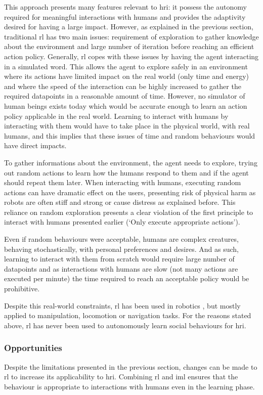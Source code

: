 	This approach presents many features relevant to \gls{hri}: it possess the autonomy required for meaningful interactions with humans and provides the adaptivity desired for having a large impact. However, as explained in the previous section, traditional \gls{rl} has two main issues: requirement of exploration to gather knowledge about the environment and large number of iteration before reaching an efficient action policy. Generally, \gls{rl} copes with these issues by having the agent interacting in a simulated word. This allows the agent to explore safely in an environment where its actions have limited impact on the real world (only time and energy) and where the speed of the interaction can be highly increased to gather the required datapoints in a reasonable amount of time. However, no simulator of human beings exists today which would be accurate enough to learn an action policy applicable in the real world. Learning to interact with humans by interacting with them would have to take place in the physical world, with real humans, and this implies that these issues of time and random behaviours would have direct impacts. 
	
	To gather informations about the environment, the agent needs to explore, trying out random actions to learn how the humans respond to them and if the agent should repeat them later. When interacting with humans, executing random actions can have dramatic effect on the users, presenting risk of physical harm as robots are often stiff and strong or cause distress as explained before. This reliance on random exploration presents a clear violation of the first principle to interact with humans presented earlier (`Only execute appropriate actions').
	
	Even if random behaviours were acceptable, humans are complex creatures, behaving stochastically, with personal preferences and desires. And as such, learning to interact with them from scratch would require large number of datapoints and as interactions with humans are slow (not many actions are executed per minute) the time required to reach an acceptable policy would be prohibitive. 
	
	Despite this real-world constraints, \gls{rl} has been used in robotics \citep{kober2013reinforcement}, but mostly applied to manipulation, locomotion or navigation tasks. For the reasons stated above, \gls{rl} has never been used to autonomously learn social behaviours for \gls{hri}. 
	
	\subsubsection{Opportunities}  
	Despite the limitations presented in the previous section, changes can be made to \gls{rl} to increase its applicability to \gls{hri}. Combining \gls{rl} and \gls{iml} ensures that the behaviour is appropriate to interactions with humans even in the learning phase.
	
